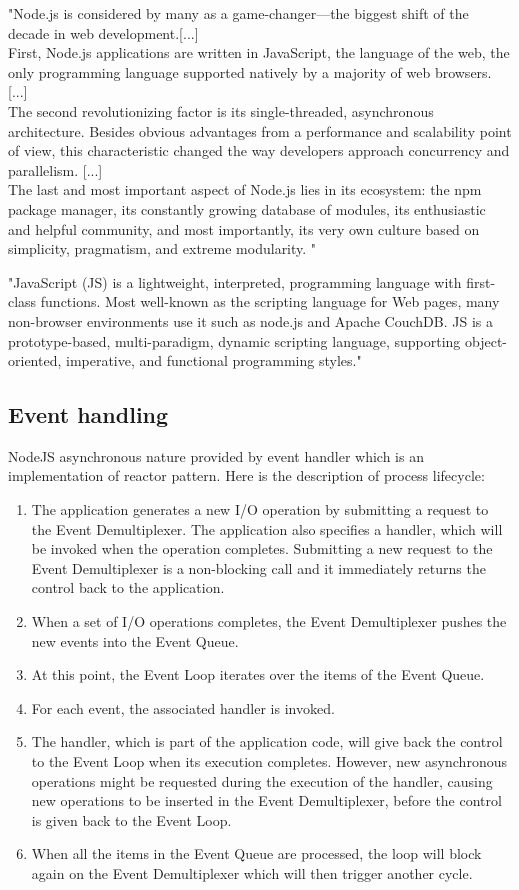 \documentclass{llncs}
\begin{document}
"Node.js is considered by many as a game-changer—the biggest shift of the decade in web development.[...]\\
 First, Node.js applications are written in JavaScript, the language of the web, the only programming language supported natively by a majority of web browsers. [...]\\
The second revolutionizing factor is its single-threaded, asynchronous architecture. 
Besides obvious advantages from a performance and scalability point of view, this characteristic changed the way developers approach concurrency and parallelism. [...]\\
The last and most important aspect of Node.js lies in its ecosystem: the npm package manager, its constantly growing database of modules, its enthusiastic and helpful community, and most importantly, its very own culture based on simplicity, pragmatism, and extreme modularity. "\cite{nodejsbook}

"JavaScript (JS) is a lightweight, interpreted, programming language with first-class functions. Most well-known as the scripting language for Web pages, many non-browser environments use it such as node.js and Apache CouchDB. JS is a prototype-based, multi-paradigm, dynamic scripting language, supporting object-oriented, imperative, and functional programming styles."\cite{mozillaJS}

\subsection{Event handling}
NodeJS asynchronous nature provided by event handler which is an implementation of reactor pattern. Here is the description of process lifecycle\cite{nodejsbook}:
\begin{enumerate}
\item The application generates a new I/O operation by submitting a request to the Event Demultiplexer. The application also specifies a handler, which will be invoked when the operation completes. Submitting a new request to the Event Demultiplexer is a non-blocking call and it immediately returns the control back to the application.
\item When a set of I/O operations completes, the Event Demultiplexer pushes the new events into the Event Queue.
\item At this point, the Event Loop iterates over the items of the Event Queue.
\item For each event, the associated handler is invoked.
\item The handler, which is part of the application code, will give back the control to the Event Loop when its execution completes. However, new asynchronous operations might be requested during the execution of the handler, causing new operations to be inserted in the Event Demultiplexer, before the control is given back to the Event Loop.
\item When all the items in the Event Queue are processed, the loop will block again on the Event Demultiplexer which will then trigger another cycle.
\end{enumerate}
\end{document}
